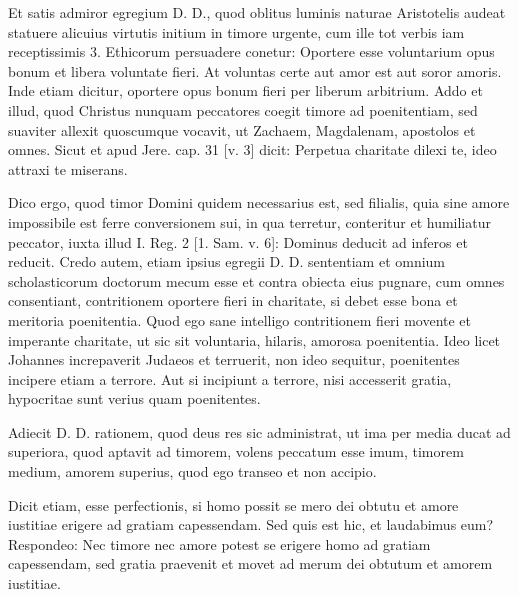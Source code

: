 Et satis admiror egregium D. D., quod oblitus luminis naturae Aristotelis audeat statuere alicuius virtutis initium in timore urgente, cum ille tot verbis iam receptissimis 3. Ethicorum persuadere conetur: Oportere esse voluntarium opus bonum et libera voluntate fieri. At voluntas certe aut amor est aut soror amoris. Inde etiam dicitur, oportere opus bonum fieri per liberum arbitrium. Addo et illud, quod Christus nunquam peccatores coegit timore ad poenitentiam, sed suaviter allexit quoscumque vocavit, ut Zachaem, Magdalenam, apostolos et omnes. Sicut et apud Jere. cap. 31 [v. 3] dicit: Perpetua charitate dilexi te, ideo attraxi te miserans.

Dico ergo, quod timor Domini quidem necessarius est, sed filialis, quia sine amore impossibile est ferre conversionem sui, in qua terretur, conteritur et humiliatur peccator, iuxta illud I. Reg. 2 [1. Sam. v. 6]: Dominus deducit ad inferos et reducit. Credo autem, etiam ipsius egregii D. D. sententiam et omnium scholasticorum doctorum mecum esse et contra obiecta eius pugnare, cum omnes consentiant, contritionem oportere fieri in charitate, si debet esse bona et meritoria poenitentia. Quod ego sane intelligo contritionem fieri movente et imperante charitate, ut sic sit voluntaria, hilaris, amorosa poenitentia. Ideo licet Johannes increpaverit Judaeos et terruerit, non ideo sequitur, poenitentes incipere etiam a terrore. Aut si incipiunt a terrore, nisi accesserit gratia, hypocritae sunt verius quam poenitentes.

Adiecit D. D. rationem, quod deus res sic administrat, ut ima per media ducat ad superiora, quod aptavit ad timorem, volens peccatum esse imum, timorem medium, amorem superius, quod ego transeo et non accipio.

Dicit etiam, esse perfectionis, si homo possit se mero dei obtutu et amore iustitiae erigere ad gratiam capessendam. Sed quis est hic, et laudabimus eum? Respondeo: Nec timore nec amore potest se erigere homo ad gratiam capessendam, sed gratia praevenit et movet ad merum dei obtutum et amorem iustitiae.


